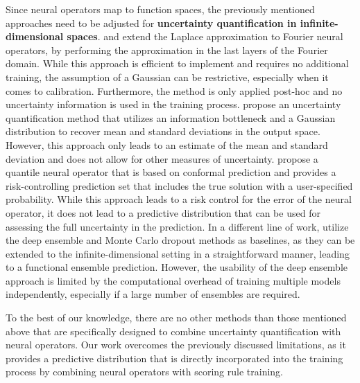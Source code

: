Since neural operators map to function spaces, the previously mentioned approaches need to be adjusted for \textbf{uncertainty quantification in infinite-dimensional spaces}. \citet{weber2024uncertainty} and \citet{magnani_linearization_2024} extend the Laplace approximation to Fourier neural operators, by performing the approximation in the last layers of the Fourier domain. While this approach is efficient to implement and requires no additional training, the assumption of a Gaussian can be restrictive, especially when it comes to calibration. Furthermore, the method is only applied post-hoc and no uncertainty information is used in the training process. \citet{guo_ib-uq_2023} propose an uncertainty quantification method that utilizes an information bottleneck and a Gaussian distribution to recover mean and standard deviations in the output space. However, this approach only leads to an estimate of the mean and standard deviation and does not allow for other measures of uncertainty. \citet{ma_calibrated_2024} propose a quantile neural operator that is based on conformal prediction and provides a risk-controlling prediction set that includes the true solution with a user-specified probability. While this approach leads to a risk control for the error of the neural operator, it does not lead to a predictive distribution that can be used for assessing the full uncertainty in the prediction. In a different line of work, \citet{ma_calibrated_2024} utilize the deep ensemble and Monte Carlo dropout methods as baselines, as they can be extended to the infinite-dimensional setting in a straightforward manner, leading to a functional ensemble prediction. However, the usability of the deep ensemble approach is limited by the computational overhead of training multiple models independently, especially if a large number of ensembles are required.

To the best of our knowledge, there are no other methods than those mentioned above that are specifically designed to combine uncertainty quantification with neural operators. Our work overcomes the previously discussed limitations, as it provides a predictive distribution that is directly incorporated into the training process by combining neural operators with scoring rule training.
